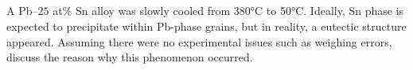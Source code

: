 \subsection{}
A Pb–$25$ at$\%$ Sn alloy was slowly cooled from 380°C to 50°C. Ideally, Sn phase is expected to precipitate within Pb-phase grains, but in reality, a eutectic structure appeared. Assuming there were no experimental issues such as weighing errors, discuss the reason why this phenomenon occurred.

